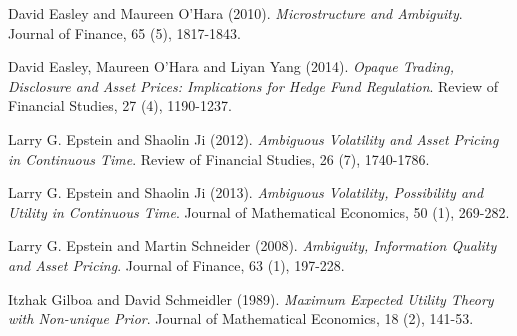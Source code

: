 \documentclass[10pt]{article}
\begin{document}
\begin{thebibliography}{99}
 David Easley and Maureen O'Hara (2010). {\it Microstructure and Ambiguity}. Journal of Finance, 65 (5), 1817-1843.

 David Easley, Maureen O'Hara and Liyan Yang (2014). {\it Opaque Trading, Disclosure and Asset Prices: Implications for Hedge Fund Regulation}. Review of Financial Studies, 27 (4), 1190-1237.



 Larry G. Epstein and Shaolin Ji (2012). {\it Ambiguous Volatility and Asset Pricing in Continuous Time}. Review of Financial Studies, 26 (7), 1740-1786.

 Larry G. Epstein and Shaolin Ji (2013). {\it Ambiguous Volatility, Possibility and Utility in Continuous Time}. Journal of Mathematical Economics, 50 (1), 269-282.

 Larry G. Epstein and Martin Schneider (2008). {\it Ambiguity, Information Quality and Asset Pricing}. Journal of Finance, 63 (1), 197-228.




 Itzhak Gilboa and David Schmeidler (1989). {\it Maximum Expected Utility Theory with Non-unique Prior}. Journal of
Mathematical Economics, 18 (2), 141-53.




\end{thebibliography}
\end{document}

